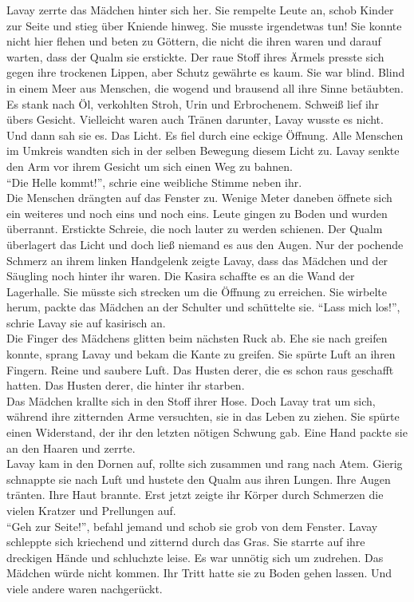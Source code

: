 Lavay zerrte das Mädchen hinter sich her. Sie rempelte Leute an, schob Kinder zur Seite und stieg 
über Kniende hinweg. Sie musste irgendetwas tun! Sie konnte nicht hier flehen und beten zu Göttern, 
die nicht die ihren waren und darauf warten, dass der Qualm sie erstickte. Der raue Stoff ihres 
Ärmels presste sich gegen ihre trockenen Lippen, aber Schutz gewährte es kaum. Sie war blind. Blind 
in einem Meer aus Menschen, die wogend und brausend all ihre Sinne betäubten. Es stank nach Öl, 
verkohlten Stroh, Urin und Erbrochenem. Schweiß lief ihr übers Gesicht. Vielleicht waren auch 
Tränen darunter, Lavay wusste es nicht.\\
Und dann sah sie es. Das Licht. Es fiel durch eine eckige Öffnung. Alle Menschen im Umkreis wandten 
sich in der selben Bewegung diesem Licht zu. Lavay senkte den Arm vor ihrem Gesicht um sich einen 
Weg zu bahnen.\\
``Die Helle kommt!'', schrie eine weibliche Stimme neben ihr.\\
Die Menschen drängten auf das Fenster zu. Wenige Meter daneben öffnete sich ein weiteres und noch 
eins und noch eins. Leute gingen zu Boden und wurden überrannt. Erstickte Schreie, die noch lauter 
zu werden schienen. Der Qualm überlagert das Licht und doch ließ niemand es aus den Augen. Nur der 
pochende Schmerz an ihrem linken Handgelenk zeigte Lavay, dass das Mädchen und der Säugling noch 
hinter ihr waren. Die Kasira schaffte es an die Wand der Lagerhalle. Sie müsste sich strecken um 
die Öffnung zu erreichen. Sie wirbelte herum, packte das Mädchen an der Schulter und schüttelte 
sie. ``Lass mich los!'', schrie Lavay sie auf kasirisch an.\\
Die Finger des Mädchens glitten beim nächsten Ruck ab. Ehe sie nach greifen konnte, sprang Lavay 
und bekam die Kante zu greifen. Sie spürte Luft an ihren Fingern. Reine und saubere Luft. Das 
Husten derer, die es schon raus geschafft hatten. Das Husten derer, die hinter ihr starben.\\
Das Mädchen krallte sich in den Stoff ihrer Hose. Doch Lavay trat um sich, während ihre zitternden 
Arme versuchten, sie in das Leben zu ziehen. Sie spürte einen Widerstand, der ihr den letzten 
nötigen Schwung gab. Eine Hand packte sie an den Haaren und zerrte.\\
Lavay kam in den Dornen auf, rollte sich zusammen und rang nach Atem. Gierig schnappte sie nach 
Luft und hustete den Qualm aus ihren Lungen. Ihre Augen tränten. Ihre Haut brannte. Erst jetzt 
zeigte ihr Körper durch Schmerzen die vielen Kratzer und Prellungen auf.\\
``Geh zur Seite!'', befahl jemand und schob sie grob von dem Fenster. Lavay schleppte sich 
kriechend und zitternd durch das Gras. Sie starrte auf ihre dreckigen Hände und schluchzte leise. 
Es war unnötig sich um zudrehen. Das Mädchen würde nicht kommen. Ihr Tritt hatte sie zu Boden gehen 
lassen. Und viele andere waren nachgerückt.\\


